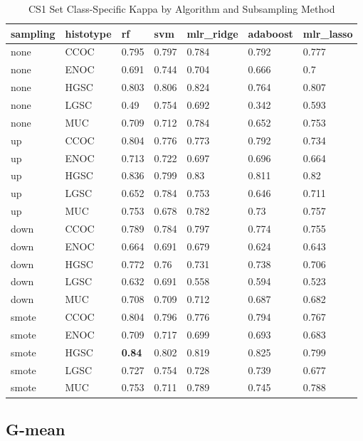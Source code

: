\documentclass[
]{report}
\begin{document}
\begin{table}

\caption{\label{tab:cs1-kappa-class-table}CS1 Set Class-Specific Kappa by Algorithm and Subsampling Method}
\centering
\begin{tabular}[t]{l|l|l|l|l|l|l}
\hline
sampling & histotype & rf & svm & mlr\_ridge & adaboost & mlr\_lasso\\
\hline
none & CCOC & 0.795 & 0.797 & 0.784 & 0.792 & 0.777\\
\hline
none & ENOC & 0.691 & 0.744 & 0.704 & 0.666 & 0.7\\
\hline
none & HGSC & 0.803 & 0.806 & 0.824 & 0.764 & 0.807\\
\hline
none & LGSC & 0.49 & 0.754 & 0.692 & 0.342 & 0.593\\
\hline
none & MUC & 0.709 & 0.712 & 0.784 & 0.652 & 0.753\\
\hline
up & CCOC & 0.804 & 0.776 & 0.773 & 0.792 & 0.734\\
\hline
up & ENOC & 0.713 & 0.722 & 0.697 & 0.696 & 0.664\\
\hline
up & HGSC & 0.836 & 0.799 & 0.83 & 0.811 & 0.82\\
\hline
up & LGSC & 0.652 & 0.784 & 0.753 & 0.646 & 0.711\\
\hline
up & MUC & 0.753 & 0.678 & 0.782 & 0.73 & 0.757\\
\hline
down & CCOC & 0.789 & 0.784 & 0.797 & 0.774 & 0.755\\
\hline
down & ENOC & 0.664 & 0.691 & 0.679 & 0.624 & 0.643\\
\hline
down & HGSC & 0.772 & 0.76 & 0.731 & 0.738 & 0.706\\
\hline
down & LGSC & 0.632 & 0.691 & 0.558 & 0.594 & 0.523\\
\hline
down & MUC & 0.708 & 0.709 & 0.712 & 0.687 & 0.682\\
\hline
smote & CCOC & 0.804 & 0.796 & 0.776 & 0.794 & 0.767\\
\hline
smote & ENOC & 0.709 & 0.717 & 0.699 & 0.693 & 0.683\\
\hline
smote & HGSC & \textbf{0.84} & 0.802 & 0.819 & 0.825 & 0.799\\
\hline
smote & LGSC & 0.727 & 0.754 & 0.728 & 0.739 & 0.677\\
\hline
smote & MUC & 0.753 & 0.711 & 0.789 & 0.745 & 0.788\\
\hline
\end{tabular}
\end{table}

\hypertarget{g-mean-2}{%
\subsection{G-mean}\label{g-mean-2}}
\end{document}
